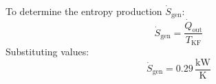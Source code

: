 To determine the entropy production \( \dot{S}_{\text{gen}} \):  
\[
\dot{S}_{\text{gen}} = \frac{\dot{Q}_{\text{out}}}{T_{\text{KF}}}
\]  
Substituting values:  
\[
\dot{S}_{\text{gen}} = 0.29 \, \frac{\text{kW}}{\text{K}}
\]
